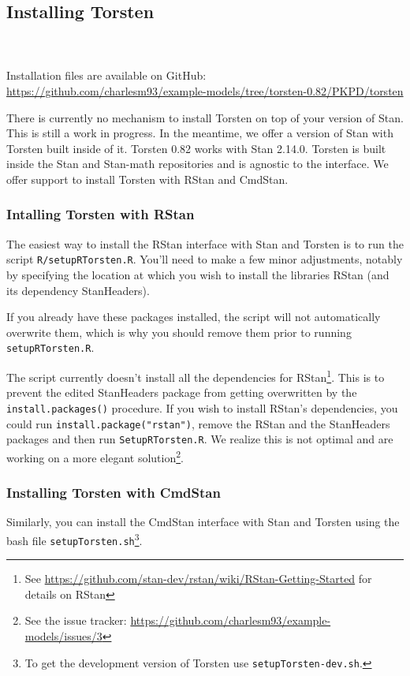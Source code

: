 \documentclass[11pt]{amsart}
\begin{document}
\subsection{Installing Torsten}  \ \\ \ \\  
Installation files are available on GitHub: \url{https://github.com/charlesm93/example-models/tree/torsten-0.82/PKPD/torsten}

There is currently no mechanism to install Torsten on top of your version of Stan. This is still a work in progress. In the meantime, we offer a version of Stan with Torsten built inside of it. Torsten 0.82 works with Stan 2.14.0. Torsten is built inside the Stan and Stan-math repositories and is agnostic to the interface. We offer support to install Torsten with RStan and CmdStan.

\subsubsection{Intalling Torsten with RStan} The easiest way to install the RStan interface with Stan and Torsten is to run the script \texttt{R/setupRTorsten.R}. You'll need to make a few minor adjustments, notably by specifying the location at which you wish to install the libraries RStan (and its dependency StanHeaders).

If you already have these packages installed, the script will not automatically overwrite them, which is why you should remove them prior to running \texttt{setupRTorsten.R}. 

The script currently doesn't install all the dependencies for RStan\footnote{See \url{https://github.com/stan-dev/rstan/wiki/RStan-Getting-Started} for details on RStan}. This is to prevent the edited StanHeaders package from getting overwritten by the \texttt{install.packages()} procedure. If you wish to install RStan's dependencies, you could run \texttt{install.package("rstan")}, remove the RStan and the StanHeaders packages and then run \texttt{SetupRTorsten.R}. We realize this is not optimal and are working on a more elegant solution\footnote{See the issue tracker: \url{https://github.com/charlesm93/example-models/issues/3}}.

\subsubsection{Installing Torsten with CmdStan} Similarly, you can install the CmdStan interface with Stan and Torsten using the bash file \texttt{setupTorsten.sh}\footnote{To get the development version of Torsten use \texttt{setupTorsten-dev.sh}.}.
\end{document}
